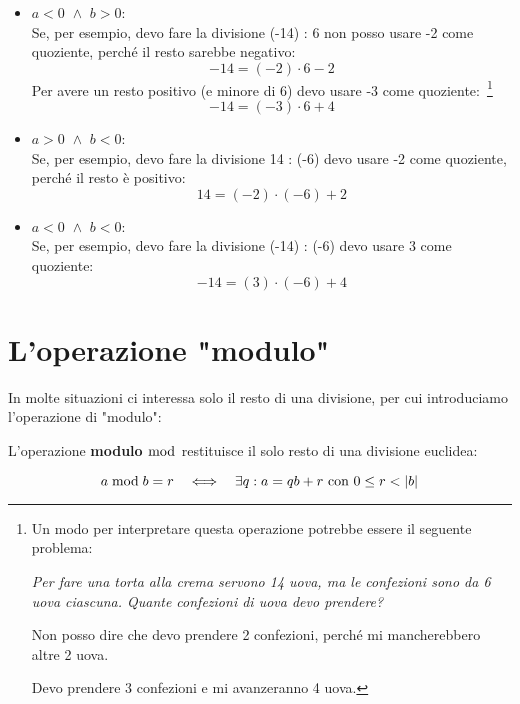 \begin{itemize}
    \item $a < 0 \,\,\land\,\, b > 0$: \\
    Se, per esempio, devo fare la divisione (-14) : 6 non posso usare -2 come quoziente, perché il resto sarebbe negativo:
    \begin{equation*}
        -14 = (-2) \cdot 6 - 2
    \end{equation*}
    Per avere un resto positivo (e minore di 6) devo usare -3 come quoziente:~\footnote{
    Un modo per interpretare questa operazione potrebbe essere il seguente problema:
    
    \emph{Per fare una torta alla crema servono 14 uova, ma le confezioni sono da 6 uova ciascuna. Quante confezioni di uova devo prendere?} 
    
    Non posso dire che devo prendere 2 confezioni, perché mi mancherebbero altre 2 uova. 
    
    Devo prendere 3 confezioni e mi avanzeranno 4 uova.}
    \begin{equation*}
        -14 = (-3) \cdot 6 + 4
    \end{equation*}

    \item $a > 0 \,\,\land\,\, b < 0$: \\
    Se, per esempio, devo fare la divisione 14 : (-6) devo usare -2 come quoziente, perché il resto è positivo:
    \begin{equation*}
        14 = (-2) \cdot (-6) + 2
    \end{equation*}

    \item $a < 0 \,\,\land\,\, b < 0$: \\
    Se, per esempio, devo fare la divisione (-14) : (-6) devo usare 3 come quoziente:
    \begin{equation*}
        -14 = (3) \cdot (-6) + 4
    \end{equation*}
\end{itemize}

\section{L'operazione "modulo"}

In molte situazioni ci interessa solo il resto di una divisione, per cui introduciamo l'operazione di "modulo":

\begin{definizione}
    L'operazione \textbf{modulo} $\bmod$ restituisce il solo resto di una divisione euclidea:

    \begin{equation}
        a \bmod b = r  \quad\Longleftrightarrow\quad  \exists q : a = qb + r \text{ con } 0 \le r <  \lvert b \rvert 
    \end{equation}
\end{definizione}


